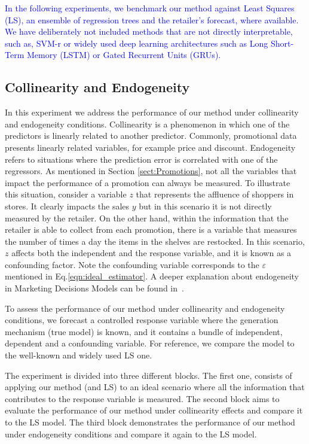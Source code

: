\documentclass{ieeeaccess}
\newcommand{\myblue}[1]{\textcolor{blue}{#1}}
\begin{document}
\myblue{In the following experiments, we benchmark our method against Least Squares (LS), an ensemble of regression trees and the retailer's forecast, where available. We have deliberately not included methods that are not directly interpretable, such as, SVM-r or widely used deep learning architectures such as Long Short-Term Memory (LSTM) or Gated Recurrent Units (GRUs).}

\subsection{Collinearity and Endogeneity} \label{subSect:muticol}

In this experiment we address the performance of our method under collinearity and endogeneity conditions. Collinearity is a phenomenon in which one of the predictors is linearly related to another predictor. Commonly, promotional data presents linearly related variables, for example price and discount. Endogeneity refers to situations where the prediction error is correlated with one of the regressors. As mentioned in Section \ref{sect:Promotions}, not all the variables that impact the performance of a promotion can always be measured. To illustrate this situation, consider a variable $z$ that represents the affluence of shoppers in stores. It clearly impacts the sales $y$ but in this scenario it is not directly measured by the retailer. On the other hand, within the information that the retailer is able to collect from each promotion, there is a variable that measures the number of times a day the items in the shelves are restocked. In this scenario, $z$ affects both the independent and the response variable, and it is known as a confounding factor. Note the confounding variable corresponds to the $\varepsilon$ mentioned in Eq.\eqref{eqn:ideal_estimator}. A deeper explanation about endogeneity in Marketing Decisions Models can be found in~\cite{Shugan2004end}.

To assess the performance of our method under collinearity and endogeneity conditions, we forecast a controlled response variable where the generation mechanism (true model) is known, and it contains a bundle of independent, dependent and a confounding variable. For reference, we compare the model to the well-known and widely used LS one.

The experiment is divided into three different blocks. The first one, consists of applying our method (and LS) to an ideal scenario where all the information that contributes to the response variable is measured. The second block aims to evaluate the performance of our method under collinearity effects and compare it to the LS model. The third block demonstrates the performance of our method under endogeneity conditions and compare it again to the LS model.
\end{document}
